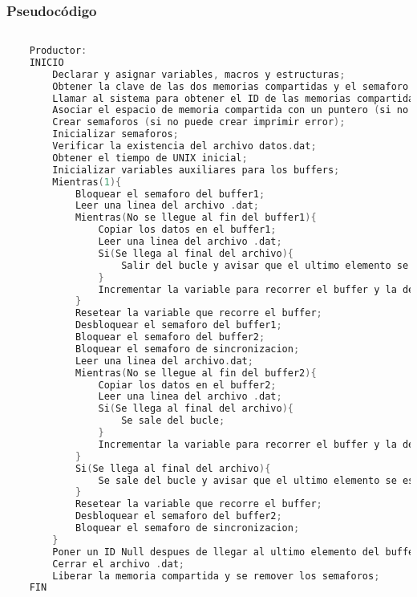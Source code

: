 \subsubsection{Pseudocódigo}

\begin{lstlisting}[language=C]          % No usar tildes en el pseudocódigo
    
    Productor:
    INICIO
        Declarar y asignar variables, macros y estructuras;
        Obtener la clave de las dos memorias compartidas y el semaforo (en el caso de no obtenerlas imprimir error);
        Llamar al sistema para obtener el ID de las memorias compartidas (en el caso de que no obtenerlas imprimir error);
        Asociar el espacio de memoria compartida con un puntero (si no puede asociar imprimir error);
        Crear semaforos (si no puede crear imprimir error);
        Inicializar semaforos;
        Verificar la existencia del archivo datos.dat;
        Obtener el tiempo de UNIX inicial;
        Inicializar variables auxiliares para los buffers;
        Mientras(1){
	        Bloquear el semaforo del buffer1;
	        Leer una linea del archivo .dat;
	        Mientras(No se llegue al fin del buffer1){
		        Copiar los datos en el buffer1;
		        Leer una linea del archivo .dat;
		        Si(Se llega al final del archivo){
			        Salir del bucle y avisar que el ultimo elemento se escribio en el buffer1;
                }
                Incrementar la variable para recorrer el buffer y la del id;
	        }
            Resetear la variable que recorre el buffer;
            Desbloquear el semaforo del buffer1;
            Bloquear el semaforo del buffer2;
            Bloquear el semaforo de sincronizacion;
            Leer una linea del archivo.dat;
            Mientras(No se llegue al fin del buffer2){
		        Copiar los datos en el buffer2;
		        Leer una linea del archivo .dat;
		        Si(Se llega al final del archivo){
			        Se sale del bucle;
                }
                Incrementar la variable para recorrer el buffer y la del ID;
            }
            Si(Se llega al final del archivo){
        	    Se sale del bucle y avisar que el ultimo elemento se escribio en el buffer2;
            }
            Resetear la variable que recorre el buffer;
            Desbloquear el semaforo del buffer2;
            Bloquear el semaforo de sincronizacion;
        }
        Poner un ID Null despues de llegar al ultimo elemento del buffer correspondiente para avisarle al consumidor que se llego al EOF;
        Cerrar el archivo .dat;
        Liberar la memoria compartida y se remover los semaforos;
    FIN


\end{lstlisting}
